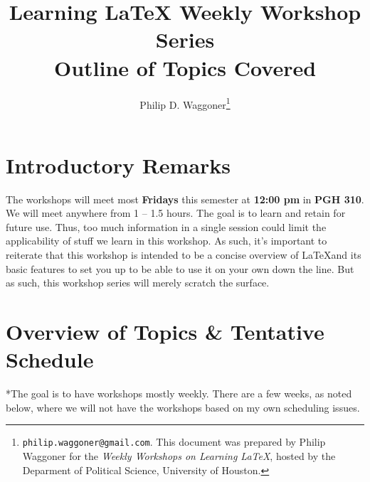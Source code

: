 \documentclass[11pt]{article}
\begin{document}
	
	\title{Learning \LaTeX \hspace{.01 cm} Weekly Workshop Series \\
		\vspace{1cm}
	\large Outline of Topics Covered \\
		\vspace{1cm}}
	\author{Philip D. Waggoner\footnote{{\texttt{philip.waggoner@gmail.com}}. This document was prepared by Philip Waggoner for the \textit{Weekly Workshops on Learning \LaTeX}, hosted by the Deparment of Political Science, University of Houston.}}
	\date{ } %
	\maketitle


\clearpage

\section{Introductory Remarks}

	The workshops will meet most \textbf{Fridays} this semester at \textbf{12:00 pm} in \textbf{PGH 310}. We will meet anywhere from 1 -- 1.5 hours. The goal is to learn and retain for future use. Thus, too much information in a single session could limit the applicability of stuff we learn in this workshop. As such, it's important to reiterate that this workshop is intended to be a concise overview of \LaTeX and its basic features to set you up to be able to use it on your own down the line. But as such, this workshop series will merely scratch the surface. 
	
\section{Overview of Topics \& Tentative Schedule}

	*The goal is to have workshops mostly weekly. There are a few weeks, as noted below, where we will not have the workshops based on my own scheduling issues.
\end{document}
